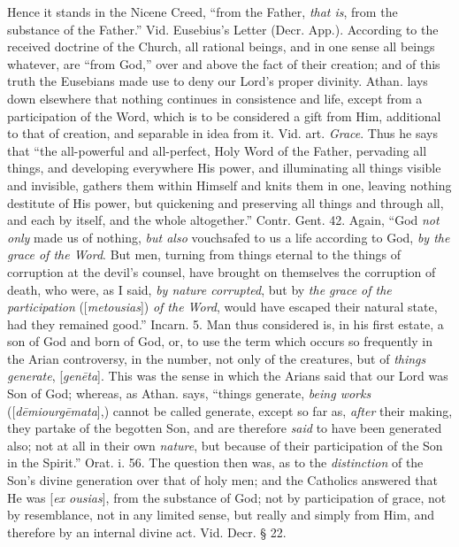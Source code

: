 Hence it stands in the Nicene Creed, ``from the
Father, \emph{that is}, from the substance of the Father.'' Vid.
Eusebius's Letter (Decr. App.). According to the received doctrine of
the Church, all rational beings, and in one sense all beings whatever,
are ``from God,'' over and above the fact of their creation; and of this
truth the Eusebians made use to deny our Lord's proper divinity.
Athan. lays down elsewhere that nothing continues in consistence and
life, except from a participation of the Word, which is to be
considered a gift from Him, additional to that of creation, and
separable in idea from it. Vid. art. \emph{Grace}. Thus he says that ``the
all-powerful and all-perfect, Holy Word of the Father, pervading all
things, and developing everywhere His power, and illuminating all
things visible and invisible, gathers them within Himself and knits
them in one, leaving nothing destitute of His power, but quickening
and preserving all things and through all, and each by itself, and the
whole altogether.'' Contr. Gent. 42. Again, ``God \emph{not only} made
us of nothing, \emph{but also} vouchsafed to us a life according to
God, \emph{by the grace of the Word}. But men, turning from things
eternal to the things of corruption at the devil's counsel, have
brought on themselves the corruption of death, who were, as I said, \emph{by
nature corrupted}, but by \emph{the grace of the participation} ([\emph{metousias}])
\emph{of the Word}, would have escaped their natural state, had they
remained good.'' Incarn. 5. Man thus considered is, in his first
estate, a son of God and born of God, or, to use the term which occurs
so frequently in the Arian controversy, in the number, not only of the
creatures, but of \emph{things generate}, [\emph{gen\={e}ta}]. This
was the sense in which the Arians said that our Lord was Son of God;
whereas, as Athan. says, ``things generate, \emph{being works} ([\emph{d\={e}miourg\={e}mata}],)
cannot be called generate, except so far as, \emph{after} their
making, they partake of the begotten Son, and are therefore \emph{said}
to have been generated also; not at all in their own \emph{nature},
but because of their participation of the Son in the Spirit.'' Orat. i.
56. The question then was, as to the \emph{distinction} of the Son's
divine generation over that of holy men; and the Catholics answered
that He was [\emph{ex ousias}], from the substance of God; not by
participation of grace, not by resemblance, not in any limited sense,
but really and simply from Him, and therefore by an internal divine
act. Vid. Decr. § 22.

